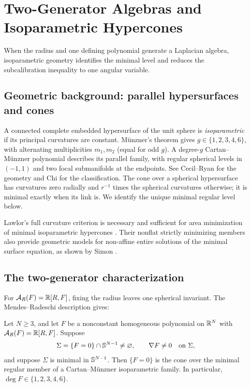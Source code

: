 \section[Isoparametric Hypercones]{Two-Generator Algebras and Isoparametric Hypercones}
\label{sec:low-rank}

When the radius and one defining polynomial generate a Laplacian
algebra, isoparametric geometry identifies the minimal level and
reduces the subcalibration inequality to one angular variable.

\subsection{Geometric background: parallel hypersurfaces and cones}
\label{sec:isoparametric-geometric-background}

A connected complete embedded hypersurface of the unit sphere is
\emph{isoparametric} if its principal curvatures are constant.
M\"unzner's theorem \cite{Muenzer80,Muenzer81} gives
\(g\in\{1,2,3,4,6\}\), with alternating multiplicities \(m_1,m_2\)
(equal for odd \(g\)). A degree-\(g\) Cartan--M\"unzner polynomial
describes its parallel family, with regular spherical levels in
\((-1,1)\) and two focal submanifolds at the endpoints. See
Cecil--Ryan \cite[Sections~3.2 and~3.4--3.6]{CecilRyan15} for the
geometry and Chi \cite[Section~4]{Chi20} for the classification.
The cone over a spherical hypersurface has curvatures zero radially
and \(r^{-1}\) times the spherical curvatures otherwise; it is minimal
exactly when its link is. We identify the unique minimal regular level below.

Lawlor's full curvature criterion is necessary and sufficient for area
minimization of minimal isoparametric hypercones
\cite[Section~4.3]{Lawlor91}. Their nonflat strictly minimizing members
also provide geometric models for non-affine entire solutions of the
minimal surface equation, as shown by Simon
\cite[Theorem~6]{Simon89}.


\subsection{The two-generator characterization}

For \(\mathcal A_R(F)=\mathbb R[R,F]\), fixing the radius leaves one spherical
invariant. The Mendes--Radeschi description gives:

\begin{theorem}
\label{thm:rank-one-classification}
Let \(N\geq3\), and let \(F\) be a nonconstant homogeneous polynomial
on \(\mathbb R^N\) with \(\mathcal A_R(F)=\mathbb R[R,F]\). Suppose
\[
 \Sigma=\{F=0\}\cap\mathbb S^{N-1}\neq\varnothing,\qquad
 \nabla F\neq0\quad\hbox{on }\Sigma,
\]
and suppose \(\Sigma\) is minimal in \(\mathbb S^{N-1}\).
Then \(\{F=0\}\) is the cone over the minimal regular member of a
Cartan--M\"unzner isoparametric family.
In particular, \(\deg F\in\{1,2,3,4,6\}\).
\end{theorem}


